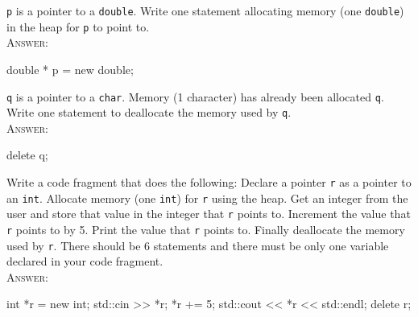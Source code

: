 

\renewcommand\AUTHOR{cadalebout1@cougars.ccis.edu} %


\topmattertwo


\nextq
\verb!p! is a pointer to a \verb!double!.
Write one statement allocating memory (one \verb!double!) in the heap
for \verb!p! to point to.
\\ \textsc{Answer:}\vspace{-2mm}
\begin{answercode}
double * p = new double;
\end{answercode}


\nextq
\verb!q! is a pointer to a \verb!char!.
Memory (1 character) has already been allocated \verb!q!.
Write one statement to deallocate the memory used by \verb!q!.
\\ \textsc{Answer:}\vspace{-2mm}
\begin{answercode}
delete q;
\end{answercode}

\nextq
Write a code fragment that does the following:
Declare a pointer \verb!r! as a pointer to an \verb!int!.
Allocate memory (one \verb!int!) for \verb!r! using the heap.
Get an integer from the user and store that value in the integer
that \verb!r! points to.
Increment the value that \verb!r! points to by 5.
Print the value that \verb!r! points to.
Finally deallocate the memory used by \verb!r!.
There should be 6 statements and
there must be only one variable declared in your code fragment.
\\ \textsc{Answer:}\vspace{-2mm}
\begin{answercode}
int *r = new int;
std::cin >> *r;
*r += 5;
std::cout << *r << std::endl;
delete r;
\end{answercode}


\newpage



